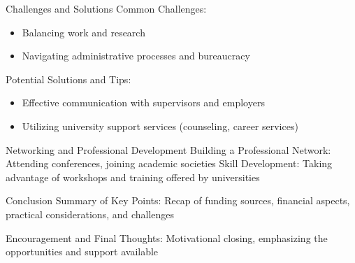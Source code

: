 \documentclass[10pt]{beamer}
\begin{document}
\begin{frame}[fragile]{Challenges and Solutions}
Common Challenges:
	\begin{itemize}
		\item Balancing work and research
		\item Navigating administrative processes and bureaucracy
	\end{itemize}

Potential Solutions and Tips:
	\begin{itemize}
		\item Effective communication with supervisors and employers
		\item Utilizing university support services (counseling, career services)
	\end{itemize}

\end{frame}

\begin{frame}[fragile]{Networking and Professional Development}
Building a Professional Network:
Attending conferences, joining academic societies
Skill Development:
Taking advantage of workshops and training offered by universities
	
\end{frame}


\begin{frame}[fragile]{Conclusion}
	Summary of Key Points:
Recap of funding sources, financial aspects, practical considerations, and challenges

	Encouragement and Final Thoughts:
Motivational closing, emphasizing the opportunities and support available
\end{frame}
\end{document}
